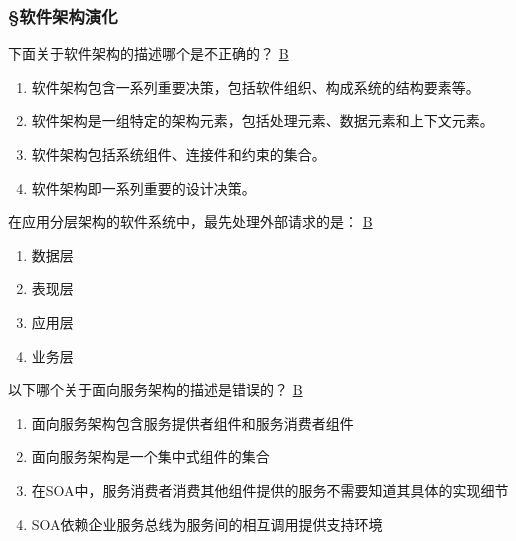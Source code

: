 \subsubsection*{\S 软件架构演化}
\setcounter{problemname}{0}

\begin{problem}
	下面关于软件架构的描述哪个是不正确的？
	\uline{B}    
        \begin{enumerate}[label=\Alph*.]
            \item 软件架构包含一系列重要决策，包括软件组织、构成系统的结构要素等。
            \item 软件架构是一组特定的架构元素，包括处理元素、数据元素和上下文元素。
            \item 软件架构包括系统组件、连接件和约束的集合。
            \item 软件架构即一系列重要的设计决策。
        \end{enumerate}
\end{problem}



\begin{problem}
	在应用分层架构的软件系统中，最先处理外部请求的是：
	\uline{B}    
    \vspace{-0.8em}
    \begin{multicols}{4}
        \begin{enumerate}[label=\Alph*.]
            \item 数据层
            \item 表现层
            \item 应用层
            \item 业务层
        \end{enumerate}
    \end{multicols}
    \vspace{-1em}
\end{problem}



\begin{problem}
	以下哪个关于面向服务架构的描述是错误的？
	\uline{B}    
        \begin{enumerate}[label=\Alph*.]
            \item 面向服务架构包含服务提供者组件和服务消费者组件
            \item 面向服务架构是一个集中式组件的集合
            \item 在SOA中，服务消费者消费其他组件提供的服务不需要知道其具体的实现细节
            \item SOA依赖企业服务总线为服务间的相互调用提供支持环境
        \end{enumerate}
\end{problem}



